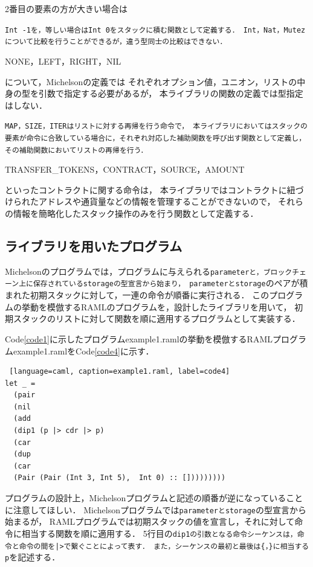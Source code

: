 \documentclass{kuisthesis}
\begin{document}
\begin{itemize}
  2番目の要素の方が大きい場合は{\tt Int -1を，等しい場合はInt 0をスタックに積む関数として定義する．
  Int，Nat，Mutezについて比較を行うことができるが，違う型同士の比較はできない．
  \item NONE，LEFT，RIGHT，NIL}について，Michelsonの定義では
  それぞれオプション値，ユニオン，リストの中身の型を引数で指定する必要があるが，
  本ライブラリの関数の定義では型指定はしない．
  \item{\tt MAP，SIZE，ITERはリストに対する再帰を行う命令で，
  本ライブラリにおいてはスタックの要素が命令に合致している場合に，それぞれ対応した補助関数を呼び出す関数として定義し，
  その補助関数においてリストの再帰を行う．
  \item TRANSFER\_TOKENS，CONTRACT，SOURCE，AMOUNT}といったコントラクトに関する命令は，
  本ライブラリではコントラクトに紐づけられたアドレスや通貨量などの情報を管理することができないので，
  それらの情報を簡略化したスタック操作のみを行う関数として定義する．
\end{itemize}

\subsection{ライブラリを用いたプログラム} \label{subsec-pro-pro}
Michelsonのプログラムでは，プログラムに与えられる{\tt parameterと，ブロックチェーン上に保存されているstorageの型宣言から始まり，
parameterとstorage}のペアが積まれた初期スタックに対して，一連の命令が順番に実行される．
このプログラムの挙動を模倣するRAMLのプログラムを，設計したライブラリを用いて，
初期スタックのリストに対して関数を順に適用するプログラムとして実装する．

Code\ref{code1}に示したプログラムexample1.ramlの挙動を模倣するRAMLプログラムexample1.ramlをCode\ref{code4}に示す．

\begin{lstlisting} [language=caml, caption=example1.raml, label=code4]
let _ =
  (pair
  (nil
  (add
  (dip1 (p |> cdr |> p)
  (car
  (dup
  (car
  (Pair (Pair (Int 3, Int 5),  Int 0) :: []))))))))
\end{lstlisting}

プログラムの設計上，Michelsonプログラムと記述の順番が逆になっていることに注意してほしい．
Michelsonプログラムでは{\tt parameterとstorage}の型宣言から始まるが，
RAMLプログラムでは初期スタックの値を宣言し，それに対して命令に相当する関数を順に適用する．
5行目の{\tt dip1の引数となる命令シーケンスは，命令と命令の間を|>で繋ぐことによって表す．
また，シーケンスの最初と最後は\{，\}に相当するp}を記述する．
\end{document}

